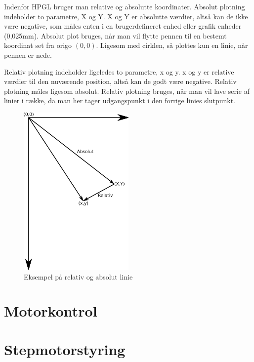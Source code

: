 Indenfor HPGL bruger man relative og absolutte koordinater. Absolut plotning indeholder to parametre, X og Y. X og Y er absolutte værdier, altså kan de ikke være negative, som måles enten i en brugerdefineret enhed eller grafik enheder (0,025mm). Absolut plot bruges, når man vil flytte pennen til en bestemt koordinat set fra origo $(0, 0)$. Ligesom med cirklen, så plottes kun en linie, når pennen er nede.


Relativ plotning indeholder ligeledes to parametre, x og y. x og y er relative værdier til den nuværende position, altså kan de godt være negative. Relativ plotning måles ligesom absolut. Relativ plotning bruges, når man vil lave serie af linier i række, da man her tager udgangspunkt i den forrige linies slutpunkt. 

\begin{figure}[htbp]
  \centering
  \includegraphics[width=0.5\textwidth]{./img/Relativ_Absolut}
  \caption{Eksempel på relativ og absolut linie}
  \label{fig:relativ-absolut}
\end{figure}

\section[Motorkontrol (med buffer)]{Motorkontrol}



\section{Stepmotorstyring}

